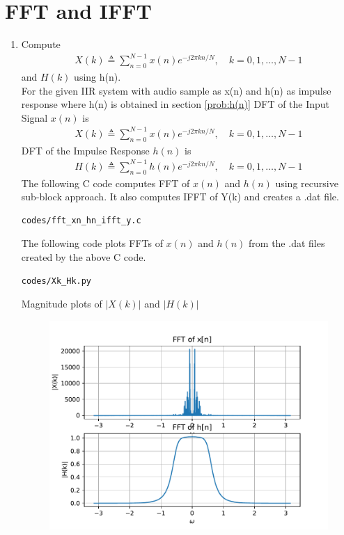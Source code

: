 \documentclass[journal,12pt,twocolumn]{IEEEtran}
\renewcommand\thesection{\arabic{section}}
\begin{document}
\section{FFT and IFFT}
\begin{enumerate}[label=\thesection.\arabic*
,ref=\thesection.\theenumi]
\item Compute
\begin{align}
        X(k) \triangleq \sum_{n=0}^{N-1} x(n) e^{-j 2 \pi k n / N}, \quad k=0,1, \ldots, N-1
\end{align}
and $H(k)$ using h(n).
\\
\solution
For the given IIR system with audio sample as x(n) and h(n) as impulse response where h(n) is obtained in section \ref{prob:h(n)} 
DFT of the Input Signal $x(n)$ is 
\begin{align}
    X(k) \triangleq \sum_{n=0}^{N-1} x(n) e^{-j 2 \pi k n / N}, \quad k=0,1, \ldots, N-1
\end{align}
DFT of the Impulse Response $h(n)$ is 
\begin{align}
    H(k) \triangleq \sum_{n=0}^{N-1} h(n) e^{-j 2 \pi k n / N}, \quad k=0,1, \ldots, N-1
\end{align}
The following C code computes FFT of $x(n)$ and $h(n)$ using recursive sub-block approach. It also computes IFFT of Y(k) and creates a .dat file.
\begin{lstlisting}
codes/fft_xn_hn_ifft_y.c
\end{lstlisting}
The following code plots FFTs of $x(n)$ and $h(n)$ from the .dat files created by the above C code.
\begin{lstlisting}
codes/Xk_Hk.py
\end{lstlisting}
Magnitude plots of $|X(k)|$ and $|H(k)|$
\begin{figure}[!ht]
\centering
\includegraphics[width=\columnwidth]{./figs/Xk_Hk}

\end{figure}
\end{enumerate}
\end{document}
